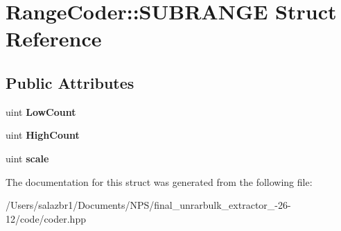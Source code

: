 \hypertarget{struct_range_coder_1_1_s_u_b_r_a_n_g_e}{\section{Range\-Coder\-:\-:S\-U\-B\-R\-A\-N\-G\-E Struct Reference}
\label{struct_range_coder_1_1_s_u_b_r_a_n_g_e}
}
\subsection*{Public Attributes}
\begin{DoxyCompactItemize}
\item 
\hypertarget{struct_range_coder_1_1_s_u_b_r_a_n_g_e_a11578b7f095d8565fd7efe6be2de12bb}{uint {\bfseries Low\-Count}}\label{struct_range_coder_1_1_s_u_b_r_a_n_g_e_a11578b7f095d8565fd7efe6be2de12bb}

\item 
\hypertarget{struct_range_coder_1_1_s_u_b_r_a_n_g_e_a554e99044a999428f02382a29ce11dee}{uint {\bfseries High\-Count}}\label{struct_range_coder_1_1_s_u_b_r_a_n_g_e_a554e99044a999428f02382a29ce11dee}

\item 
\hypertarget{struct_range_coder_1_1_s_u_b_r_a_n_g_e_abee4afcbcde5137dc02a6b45248e6207}{uint {\bfseries scale}}\label{struct_range_coder_1_1_s_u_b_r_a_n_g_e_abee4afcbcde5137dc02a6b45248e6207}

\end{DoxyCompactItemize}


The documentation for this struct was generated from the following file\-:\begin{DoxyCompactItemize}
\item 
/\-Users/salazbr1/\-Documents/\-N\-P\-S/final\-\_\-unrarbulk\-\_\-extractor\-\_-\/26-\/12/code/coder.\-hpp\end{DoxyCompactItemize}
